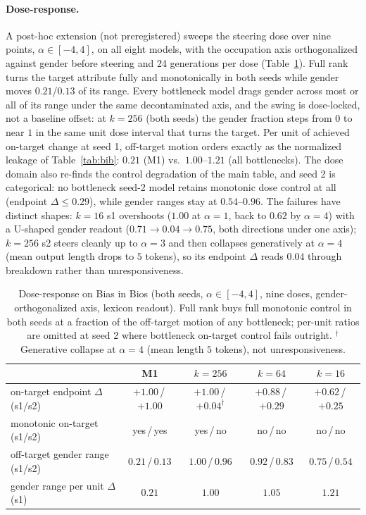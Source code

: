 \documentclass[11pt]{article}
\begin{document}
\paragraph{Dose-response.} A post-hoc extension (not preregistered) sweeps
the steering dose over nine points, $\alpha \in [-4, 4]$, on all eight
models, with the occupation axis orthogonalized against gender before
steering and 24 generations per dose (Table~\ref{tab:dose}). Full rank
turns the target attribute fully and monotonically in both seeds while
gender moves $0.21$/$0.13$ of its range. Every bottleneck model drags
gender across most or all of its range under the same decontaminated
axis, and the swing is dose-locked, not a baseline offset: at $k{=}256$
(both seeds) the gender fraction steps from $0$ to near $1$ in the same
unit dose interval that turns the target. Per unit of achieved on-target
change at seed 1, off-target motion orders exactly as the normalized
leakage of Table~\ref{tab:bib}: $0.21$ (M1) vs.\ $1.00$--$1.21$ (all
bottlenecks). The dose domain also re-finds the control degradation of
the main table, and seed 2 is categorical: no bottleneck seed-2 model
retains monotonic dose control at all (endpoint $\Delta \leq 0.29$),
while gender ranges stay at $0.54$--$0.96$. The failures have distinct
shapes: $k{=}16$ s1 overshoots ($1.00$ at $\alpha{=}1$, back to $0.62$ by
$\alpha{=}4$) with a U-shaped gender readout ($0.71 \to 0.04 \to 0.75$,
both directions under one axis); $k{=}256$ s2 steers cleanly up to
$\alpha{=}3$ and then collapses generatively at $\alpha{=}4$ (mean output
length drops to $5$ tokens), so its endpoint $\Delta$ reads $0.04$
through breakdown rather than unresponsiveness.

\begin{table}[h]\centering\small
\begin{tabular}{l cccc}
& M1 & $k{=}256$ & $k{=}64$ & $k{=}16$ \\
\hline
on-target endpoint $\Delta$ (s1/s2) & $+1.00$\,/\,$+1.00$ & $+1.00$\,/\,$+0.04^{\dagger}$ & $+0.88$\,/\,$+0.29$ & $+0.62$\,/\,$+0.25$ \\
monotonic on-target (s1/s2)         & yes\,/\,yes & yes\,/\,no & no\,/\,no & no\,/\,no \\
off-target gender range (s1/s2)     & $0.21$\,/\,$0.13$ & $1.00$\,/\,$0.96$ & $0.92$\,/\,$0.83$ & $0.75$\,/\,$0.54$ \\
gender range per unit $\Delta$ (s1) & $0.21$ & $1.00$ & $1.05$ & $1.21$ \\
\end{tabular}
\caption{Dose-response on Bias in Bios (both seeds, $\alpha \in [-4,4]$,
nine doses, gender-orthogonalized axis, lexicon readout). Full rank buys
full monotonic control in both seeds at a fraction of the off-target
motion of any bottleneck; per-unit ratios are omitted at seed 2 where
bottleneck on-target control fails outright. $^{\dagger}$Generative
collapse at $\alpha{=}4$ (mean length $5$ tokens), not unresponsiveness.}
\label{tab:dose}
\end{table}
\end{document}
